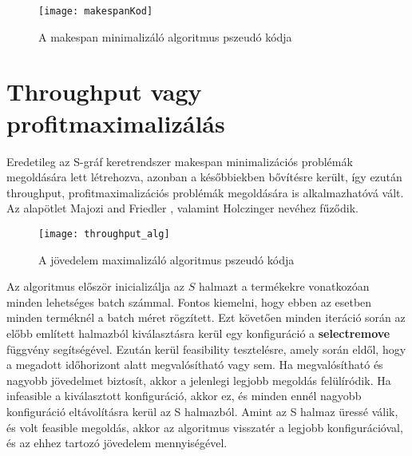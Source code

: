 \begin{figure}[H]
\begin{center}
\texttt{[image: makespanKod]}
\caption{A makespan minimalizáló algoritmus pszeudó kódja\cite{Hegyhati}}
\label{makespanKod}
\end{center}
\end{figure}

\section{Throughput vagy profitmaximalizálás}
Eredetileg az S-gráf keretrendszer makespan minimalizációs problémák megoldására lett létrehozva, azonban a későbbiekben bővítésre került, így ezután throughput, profitmaximalizációs problémák megoldására is alkalmazhatóvá vált. Az alapötlet Majozi and Friedler \cite{majozifriedler}, valamint Holczinger \cite{holczinger} nevéhez fűződik.
\begin{figure}[H]
\begin{center}
\texttt{[image: throughput\_alg]}
\caption{A jövedelem maximalizáló algoritmus pszeudó kódja \cite{Hegyhati}}
\label{throughput_alg}
\end{center}
\end{figure}
Az algoritmus először inicializálja az $S$ halmazt a termékekre vonatkozóan minden lehetséges batch számmal. Fontos kiemelni, hogy ebben az esetben minden terméknél a batch méret rögzített. Ezt követően minden iteráció során az előbb említett halmazból kiválasztásra kerül egy konfiguráció a \textbf{select\textunderscore remove} függvény segítségével. Ezután kerül feasibility tesztelésre, amely során eldől, hogy a megadott időhorizont alatt megvalósítható vagy sem. Ha megvalósítható és nagyobb jövedelmet biztosít, akkor a jelenlegi legjobb megoldás felülíródik. Ha infeasible a kiválasztott konfiguráció, akkor ez, és minden ennél nagyobb konfiguráció eltávolításra kerül az S halmazból. Amint az S halmaz üressé válik, és volt feasible megoldás, akkor az algoritmus visszatér a legjobb konfigurációval, és az ehhez tartozó jövedelem mennyiségével.

